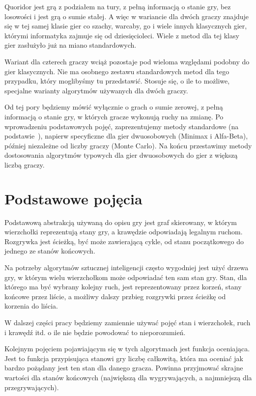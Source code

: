 \documentclass{pracamgr}
\begin{document}
Quoridor jest grą z podziałem na tury, z pełną informacją o stanie gry, bez losowości i jest grą o sumie stałej.
A więc w wariancie dla dwóch graczy znajduje się w tej samej klasie gier co szachy, warcaby, go i wiele innych klasycznych gier, którymi informatyka zajmuje się od dziesięcioleci.
Wiele z metod dla tej klasy gier zasłużyło już na miano standardowych.

Wariant dla czterech graczy wciąż pozostaje pod wieloma względami podobny do gier klasycznych.
Nie ma osobnego zestawu standardowych metod dla tego przypadku, który moglibyśmy tu przedstawić.
Stosuje się, o ile to możliwe, specjalne warianty algorytmów używanych dla dwóch graczy.

Od tej pory będziemy mówić wyłącznie o grach o sumie zerowej, z pełną informacją o stanie gry, w których gracze wykonują ruchy na zmianę.
Po wprowadzeniu podstawowych pojęć, zaprezentujemy metody standardowe (na podstawie~\cite{pawlewicz}), napierw specyficzne dla gier dwuosobowych (Minimax i Alfa-Beta), później niezależne od liczby graczy (Monte Carlo).
Na końcu przestawimy metody dostosowania algorytmów typowych dla gier dwuosobowych do gier z większą liczbą graczy.

\section{Podstawowe pojęcia}

Podstawową abstrakcją używaną do opisu gry jest graf skierowany, w którym wierzchołki reprezentują stany gry, a krawędzie odpowiadają legalnym ruchom.
Rozgrywka jest ścieżką, być może zawierającą cykle, od stanu początkowego do jednego ze stanów końcowych.

Na potrzeby algorytmów sztucznej inteligencji często wygodniej jest użyć drzewa gry, w którym wielu wierzchołkom może odpowiadać ten sam stan gry.
Stan, dla którego ma być wybrany kolejny ruch, jest reprezentowany przez korzeń, stany końcowe przez liście, a możliwy dalszy przbieg rozgrywki przez ścieżkę od korzenia do liścia.

W dalszej części pracy będziemy zamiennie używać pojęć stan i wierzchołek, ruch i krawędź itd. o ile nie będzie powodować to nieporozumień.

Kolejnym pojęciem pojawiającym się w tych algorytmach jest funkcja oceniająca.
Jest to funkcja przypisująca stanowi gry liczbę całkowitą, która ma oceniać jak bardzo pożądany jest ten stan dla danego gracza.
Powinna przyjmować skrajne wartości dla stanów końcowych (największą dla wygrywających, a najmniejszą dla przegrywających).
\end{document}
